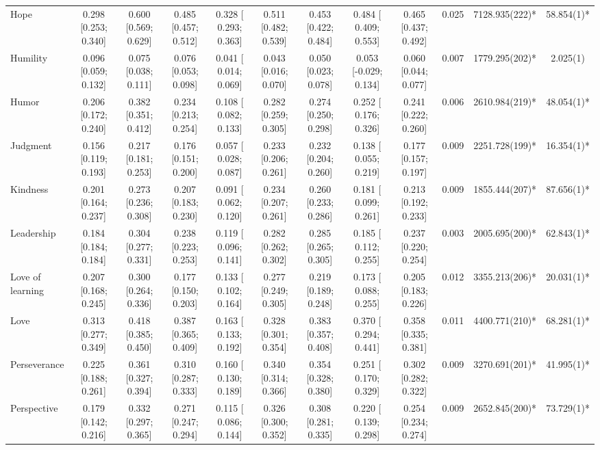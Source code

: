 \documentclass[
  man,floatsintext]{apa6}
\begin{document}
\begin{table}
{\begin{tabular}[t]{lccccccccccc}
Hope & 0.298 [0.253; 0.340] & 0.600 [0.569; 0.629] & 0.485 [0.457; 0.512] & 0.328 [ 0.293; 0.363] & 0.511 [0.482; 0.539] & 0.453 [0.422; 0.484] & 0.484 [ 0.409; 0.553] & 0.465 [0.437; 0.492] & 0.025 & 7128.935(222)* & 58.854(1)*\\
Humility & 0.096 [0.059; 0.132] & 0.075 [0.038; 0.111] & 0.076 [0.053; 0.098] & 0.041 [ 0.014; 0.069] & 0.043 [0.016; 0.070] & 0.050 [0.023; 0.078] & 0.053 [-0.029; 0.134] & 0.060 [0.044; 0.077] & 0.007 & 1779.295(202)* & 2.025(1)\\
\addlinespace
Humor & 0.206 [0.172; 0.240] & 0.382 [0.351; 0.412] & 0.234 [0.213; 0.254] & 0.108 [ 0.082; 0.133] & 0.282 [0.259; 0.305] & 0.274 [0.250; 0.298] & 0.252 [ 0.176; 0.326] & 0.241 [0.222; 0.260] & 0.006 & 2610.984(219)* & 48.054(1)*\\
Judgment & 0.156 [0.119; 0.193] & 0.217 [0.181; 0.253] & 0.176 [0.151; 0.200] & 0.057 [ 0.028; 0.087] & 0.233 [0.206; 0.261] & 0.232 [0.204; 0.260] & 0.138 [ 0.055; 0.219] & 0.177 [0.157; 0.197] & 0.009 & 2251.728(199)* & 16.354(1)*\\
Kindness & 0.201 [0.164; 0.237] & 0.273 [0.236; 0.308] & 0.207 [0.183; 0.230] & 0.091 [ 0.062; 0.120] & 0.234 [0.207; 0.261] & 0.260 [0.233; 0.286] & 0.181 [ 0.099; 0.261] & 0.213 [0.192; 0.233] & 0.009 & 1855.444(207)* & 87.656(1)*\\
Leadership & 0.184 [0.184; 0.184] & 0.304 [0.277; 0.331] & 0.238 [0.223; 0.253] & 0.119 [ 0.096; 0.141] & 0.282 [0.262; 0.302] & 0.285 [0.265; 0.305] & 0.185 [ 0.112; 0.255] & 0.237 [0.220; 0.254] & 0.003 & 2005.695(200)* & 62.843(1)*\\
Love of learning & 0.207 [0.168; 0.245] & 0.300 [0.264; 0.336] & 0.177 [0.150; 0.203] & 0.133 [ 0.102; 0.164] & 0.277 [0.249; 0.305] & 0.219 [0.189; 0.248] & 0.173 [ 0.088; 0.255] & 0.205 [0.183; 0.226] & 0.012 & 3355.213(206)* & 20.031(1)*\\
\addlinespace
Love & 0.313 [0.277; 0.349] & 0.418 [0.385; 0.450] & 0.387 [0.365; 0.409] & 0.163 [ 0.133; 0.192] & 0.328 [0.301; 0.354] & 0.383 [0.357; 0.408] & 0.370 [ 0.294; 0.441] & 0.358 [0.335; 0.381] & 0.011 & 4400.771(210)* & 68.281(1)*\\
Perseverance & 0.225 [0.188; 0.261] & 0.361 [0.327; 0.394] & 0.310 [0.287; 0.333] & 0.160 [ 0.130; 0.189] & 0.340 [0.314; 0.366] & 0.354 [0.328; 0.380] & 0.251 [ 0.170; 0.329] & 0.302 [0.282; 0.322] & 0.009 & 3270.691(201)* & 41.995(1)*\\
Perspective & 0.179 [0.142; 0.216] & 0.332 [0.297; 0.365] & 0.271 [0.247; 0.294] & 0.115 [ 0.086; 0.144] & 0.326 [0.300; 0.352] & 0.308 [0.281; 0.335] & 0.220 [ 0.139; 0.298] & 0.254 [0.234; 0.274] & 0.009 & 2652.845(200)* & 73.729(1)*\\

\end{tabular}}
\end{table}
\end{document}
